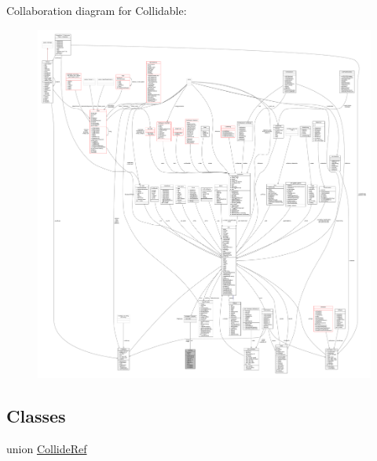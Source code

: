Collaboration diagram for Collidable\+:
\nopagebreak
\begin{figure}[H]
\begin{center}
\leavevmode
\includegraphics[width=350pt]{da/dbd/classCollidable__coll__graph}
\end{center}
\end{figure}
\subsection*{Classes}
\begin{DoxyCompactItemize}
\item 
union \hyperlink{unionCollidable_1_1CollideRef}{Collide\+Ref}
\end{DoxyCompactItemize}
